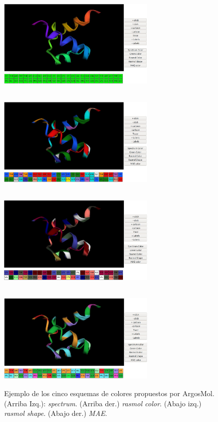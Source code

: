 \documentclass{article}
\begin{document}
\begin{itemize}
	\begin{figure}[H]
		\centering
		\begin{multicols}{2}
			\includegraphics[width=7.5cm,height=5cm]{img/papers/argos2}\par 
			\includegraphics[width=7.5cm,height=5cm]{img/papers/argos7}\par 
			\includegraphics[width=7.5cm,height=5cm]{img/papers/argos8}\par 
			\includegraphics[width=7.5cm,height=5cm]{img/papers/argos9}\par 
		\end{multicols}
		\caption{Ejemplo de los cinco esquemas de colores propuestos por ArgosMol. (Arriba Izq.): \textit{spectrum}. (Arriba der.) \textit{rasmol color}. (Abajo izq.) \textit{rasmol shape}. (Abajo der.) \textit{MAE}.}
		\label{fig:argos3}
	\end{figure}


\end{itemize}
\end{document}
